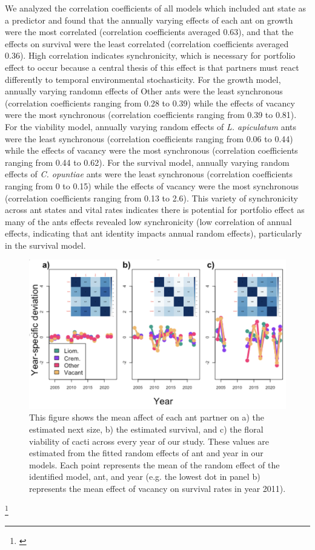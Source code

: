 \documentclass[11pt]{article}
\newcommand{\ali}[2]{{\color{blue}{#1}}\footnote{\textit{\color{blue}{#2}}}}
\begin{document}
We analyzed the correlation coefficients of all models which included ant state as a predictor and found that the annually varying effects of each ant on growth were the most correlated (correlation coefficients averaged 0.63), and that the effects on survival were the least correlated (correlation coefficients averaged 0.36). 
High correlation indicates synchronicity, which is necessary for portfolio effect to occur because a central thesis of this effect is that partners must react differently to temporal environmental stochasticity.
For the growth model, annually varying randomn effects of Other ants were the least synchronous (correlation coefficients ranging from 0.28 to 0.39) while the effects of vacancy were the most synchronous (correlation coefficients ranging from 0.39 to 0.81).
For the viability model, annually varying random effects of \textit{L. apiculatum} ants were the least synchronous (correlation coefficients ranging from 0.06 to 0.44) while the effects of vacancy were the most synchronous (correlation coefficients ranging from 0.44 to 0.62).
For the survival model, annually varying random effects of \textit{C. opuntiae} ants were the least synchronous (correlation coefficients ranging from 0 to 0.15) while the effects of vacancy were the most synchronous (correlation coefficients ranging from 0.13 to 2.6).
This variety of synchronicity across ant states and vital rates indicates there is potential for portfolio effect as many of the ants effects revealed low synchronicity (low correlation of annual effects, indicating that ant identity impacts annual random effects), particularly in the survival model. 


\begin{figure}[H]
	\includegraphics[width=0.95\linewidth]{Figures/ant_RFX.png}
	\caption{This figure shows the mean affect of each ant partner on a) the estimated next size, b) the estimated survival, and c) the floral viability of cacti across every year of our study. These values are estimated from the fitted random effects of ant and year in our models. Each point represents the mean of the random effect of the identified model, ant, and year (e.g. the lowest dot in panel b) represents the mean effect of vacancy on survival rates in year 2011).}
	\label{fig:Annual_Ant}
\end{figure}
\ali{}{Honestly not sure if I should include an image for this one or just report some values? We should discuss. }
\end{document}

